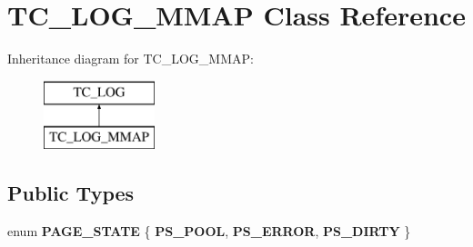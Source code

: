 \hypertarget{classTC__LOG__MMAP}{}\section{T\+C\+\_\+\+L\+O\+G\+\_\+\+M\+M\+AP Class Reference}
\label{classTC__LOG__MMAP}
Inheritance diagram for T\+C\+\_\+\+L\+O\+G\+\_\+\+M\+M\+AP\+:\begin{figure}[H]
\begin{center}
\leavevmode
\includegraphics[height=2.000000cm]{classTC__LOG__MMAP}
\end{center}
\end{figure}
\subsection*{Public Types}
\begin{DoxyCompactItemize}
\item 
\mbox{\label{classTC__LOG__MMAP_aa4fe72752e9a7b0d22ba52f85162751a}} 
enum {\bfseries P\+A\+G\+E\+\_\+\+S\+T\+A\+TE} \{ {\bfseries P\+S\+\_\+\+P\+O\+OL}, 
{\bfseries P\+S\+\_\+\+E\+R\+R\+OR}, 
{\bfseries P\+S\+\_\+\+D\+I\+R\+TY}
 \}
\end{DoxyCompactItemize}
